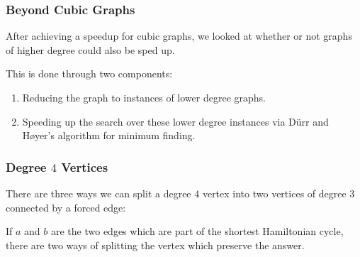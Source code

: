 \documentclass[]{beamer}
\begin{document}
\begin{frame}
\frametitle{Beyond Cubic Graphs}
After achieving a speedup for cubic graphs, we looked at whether or not graphs of higher degree could also be sped up.

This is done through two components:
\begin{enumerate}
\item Reducing the graph to instances of lower degree graphs.
\item Speeding up the search over these lower degree instances via D\"urr and H\o yer's algorithm for minimum finding.
\end{enumerate}
\end{frame}

\begin{frame}
\frametitle{Degree $4$ Vertices}

There are three ways we can split a degree $4$ vertex into two vertices of degree $3$ connected by a forced edge:

\begin{center}
\end{center}

If $a$ and $b$ are the two edges which are part of the shortest Hamiltonian cycle, there are two ways of splitting the vertex which preserve the answer.
\end{frame}
\end{document}
